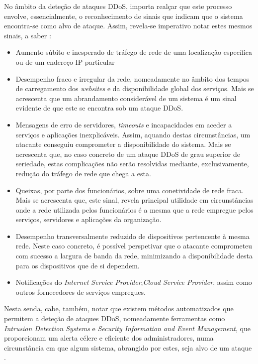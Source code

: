 No âmbito da deteção de ataques DDoS, importa realçar que este processo envolve, essencialmente, o reconhecimento de sinais que indicam que o sistema encontra-se como alvo de ataque. Assim, revela-se imperativo notar estes mesmos sinais, a saber \cite{cybergc_defending_agaisnt_ddos}:
\begin{itemize}
    \item Aumento súbito e inesperado de tráfego de rede de uma localização específica ou de um endereço IP particular
    \item Desempenho fraco e irregular da rede, nomeadamente no âmbito dos tempos de carregamento dos \textit{websites} e da disponibilidade global dos serviços. Mais se acrescenta que um abrandamento considerável de um sistema é um sinal evidente de que este se encontra sob um ataque DDoS.
    \item Mensagens de erro de servidores, \textit{timeouts} e incapacidades em aceder a serviços e aplicações inexplicáveis. Assim, aquando destas circunstâncias, um atacante conseguiu comprometer a disponibilidade do sistema. Mais se acrescenta que, no caso concreto de um ataque DDoS de grau superior de seriedade, estas complicações não serão resolvidas mediante, exclusivamente, redução do tráfego de rede que chega a esta.
    \item Queixas, por parte dos funcionários, sobre uma conetividade de rede fraca. Mais se acrescenta que, este sinal, revela principal utilidade em circunstâncias onde a rede utilizada pelos funcionários é a mesma que a rede empregue pelos serviços, servidores e aplicações da organização.
    \item Desempenho transversalmente reduzido de dispositivos pertencente à mesma rede. Neste caso concreto, é possível perspetivar que o atacante comprometeu com sucesso a largura de banda da rede, minimizando a disponibilidade desta para os dispositivos que de si dependem.
    \item Notificações do \textit{Internet Service Provider},\textit{Cloud Service Provider}, assim como outros fornecedores de serviços empregues.
\end{itemize}

Nesta senda, cabe, também, notar que existem métodos automatizados que permitem a deteção de ataques DDoS, nomeadamente ferramentas como \textit{Intrusion Detection Systems} e \textit{Security Information and Event Management}, que proporcionam um alerta célere e eficiente dos administradores, numa circunstância em que algum sistema, abrangido por estes, seja alvo de um ataque \cite{suntera_rise_ddos}.

